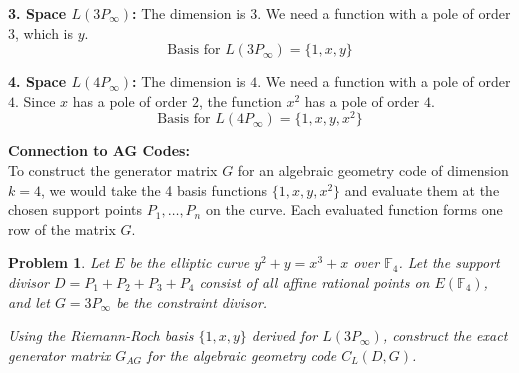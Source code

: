 \documentclass[11pt]{article}
\newtheorem{problem}{Problem}
\begin{document}
\begin{mdframed}[backgroundcolor=gray!5, linecolor=gray!50, linewidth=1pt]
		\textbf{3. Space $L(3P_\infty)$:} 
		The dimension is $3$. We need a function with a pole of order $3$, which is $y$.
		$$ \text{Basis for } L(3P_\infty) = \{ 1, x, y \} $$
		
		\textbf{4. Space $L(4P_\infty)$:} 
		The dimension is $4$. We need a function with a pole of order $4$. Since $x$ has a pole of order $2$, the function $x^2$ has a pole of order $4$.
		$$ \text{Basis for } L(4P_\infty) = \{ 1, x, y, x^2 \} $$
		
		\vspace{0.5cm}
		\begin{center}
		\end{center}
		
		\vspace{0.2cm}
		\textbf{Connection to AG Codes:} \\
		To construct the generator matrix $G$ for an algebraic geometry code of dimension $k=4$, we would take the 4 basis functions $\{1, x, y, x^2\}$ and evaluate them at the chosen support points $P_1, \dots, P_n$ on the curve. Each evaluated function forms one row of the matrix $G$.
	\end{mdframed}

	\newpage
	\begin{problem}
		Let $E$ be the elliptic curve $y^2 + y = x^3 + x$ over $\mathbb{F}_4$. Let the support divisor $D = P_1 + P_2 + P_3 + P_4$ consist of all affine rational points on $E(\mathbb{F}_4)$, and let $G = 3P_\infty$ be the constraint divisor. 
		
		Using the Riemann-Roch basis $\{1, x, y\}$ derived for $L(3P_\infty)$, construct the exact generator matrix $G_{AG}$ for the algebraic geometry code $C_L(D, G)$.
	\end{problem}
	
\end{document}
